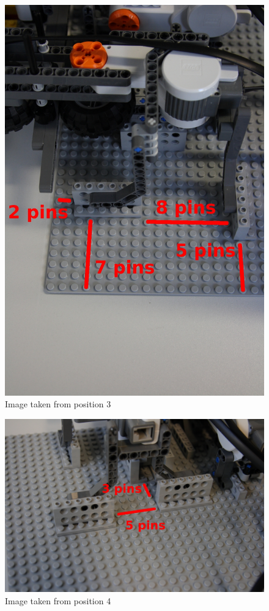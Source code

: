 \documentclass[%
  a4paper,%
  11pt,%
  blue,%
  hyperref	%
  ]{tubsartcl}
\begin{document}
\begin{figure}[!htb]
\begin{center}
\includegraphics[scale=0.4]{graphics/3.jpg}
\end{center}
\caption{Image taken from position 3}
\end{figure}

\begin{figure}[!htb]
\begin{center}
\includegraphics[scale=0.3]{graphics/4.jpg}
\end{center}
\caption{Image taken from position 4}
\end{figure}
\end{document}
